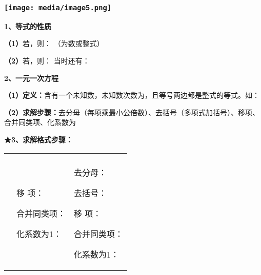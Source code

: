 \documentclass[a4paper,11pt,UTF8]{ctexart}
\begin{document}
\hypertarget{ux5b66ux79d1ux7f51www.zxxk.com--ux6559ux80b2ux8d44ux6e90ux95e8ux6237ux63d0ux4f9bux8bd5ux9898ux8bd5ux5377ux6559ux6848ux8bfeux4ef6ux6559ux5b66ux8bbaux6587ux7d20ux6750ux7b49ux5404ux7c7bux6559ux5b66ux8d44ux6e90ux5e93ux4e0bux8f7dux8fd8ux6709ux5927ux91cfux4e30ux5bccux7684ux6559ux5b66ux8d44ux8baf-31}{%
\subsubsection{\texorpdfstring{\protect\texttt{[image: media/image5.png]}}{学科网(www.zxxk.com)-\/-教育资源门户，提供试题试卷、教案、课件、教学论文、素材等各类教学资源库下载，还有大量丰富的教学资讯！}}\label{ux5b66ux79d1ux7f51www.zxxk.com--ux6559ux80b2ux8d44ux6e90ux95e8ux6237ux63d0ux4f9bux8bd5ux9898ux8bd5ux5377ux6559ux6848ux8bfeux4ef6ux6559ux5b66ux8bbaux6587ux7d20ux6750ux7b49ux5404ux7c7bux6559ux5b66ux8d44ux6e90ux5e93ux4e0bux8f7dux8fd8ux6709ux5927ux91cfux4e30ux5bccux7684ux6559ux5b66ux8d44ux8baf-31}}

\textbf{1、等式的性质}

\textbf{（1）}若，则： （为数或整式）

\textbf{（2）}若，则： 当时还有：

\textbf{2、一元一次方程}

\textbf{（1）定义：}含有一个未知数，未知数次数为，且等号两边都是整式的等式。如：

\textbf{（2）求解步骤：}去分母（每项乘最小公倍数）、去括号（多项式加括号）、移项、合并同类项、化系数为

\textbf{★3、求解格式步骤：}

\begin{longtable}[]{@{}lll@{}}
\toprule
\endhead
& &\tabularnewline
\begin{minipage}[t]{0.30\columnwidth}\raggedright
\strut
\end{minipage} & \begin{minipage}[t]{0.30\columnwidth}\raggedright
移 项：

合并同类项：

化系数为1：\strut
\end{minipage} & \begin{minipage}[t]{0.30\columnwidth}\raggedright
去分母：

去括号：

移 项：

合并同类项：

化系数为1：\strut
\end{minipage}\tabularnewline
\bottomrule
\end{longtable}
\end{document}
